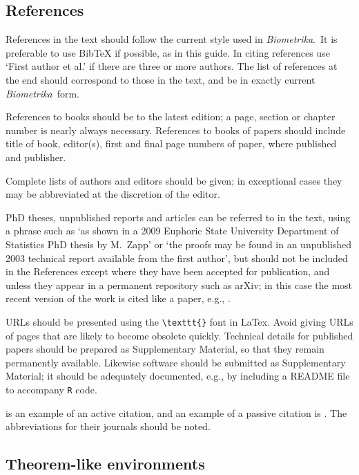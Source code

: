 \documentclass[supplementary,lineno]{biometrika}
\def\Bka{{\it Biometrika}}
\begin{document}
\subsection{References}

References in the text should follow the current style used in \Bka.\ It is preferable to use BibTeX
if possible, as in this guide.  In citing
references use `First author et al.' if there are three or more authors. The list of references at
the end should correspond to those in the text, and be in exactly current \Bka\
form.

References to books should be to the latest edition; a page, section or chapter number
is nearly always necessary. References to books of papers should include title of book,
editor(s), first and final page numbers of paper, where published and publisher.

Complete lists of authors and editors should be given; in exceptional cases they may be abbreviated at the discretion of the editor.

PhD theses, unpublished reports and articles can be referred to in the text, using a phrase such as `as shown in a 2009 Euphoric State University Department of Statistics PhD thesis by M.~Zapp' or `the proofs may be found in an unpublished 2003 technical report available from the first author', but should not be included in the References except where they have been accepted for publication, and unless they appear in a permanent repository such as arXiv; in this case the most recent version of the work is cited like a paper, e.g., \citet{Berrendero.etal:2015}.

 URLs should be presented using the \verb;\texttt{}; font in LaTex. Avoid giving URLs of pages that are likely
to become obsolete quickly.  Technical details for published papers should be prepared as Supplementary Material, so that they remain permanently available. Likewise software should be submitted as Supplementary Material; it should be adequately documented, e.g., by including a README file to accompany \texttt{R} code.

\citet{Cox:1972} is an example of an active citation, and an example of a passive citation is  \citep{Hear:Holm:Step:quan:2006}.  The abbreviations for their journals should be noted.

\subsection{Theorem-like environments}
\end{document}
